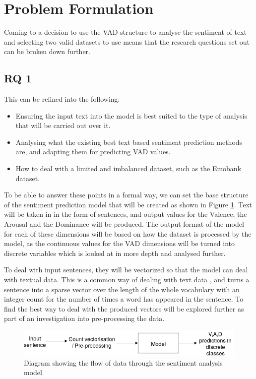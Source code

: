 \section{Problem Formulation}

Coming to a decision to use the VAD structure to analyse the sentiment of text and selecting two valid datasets to use means that the research questions set out can be broken down further.

\subsection{RQ 1}

This can be refined into the following: 

\begin{itemize}
    \item Ensuring the input text into the model is best suited to the type of analysis that will be carried out over it. 
    \item Analysing what the existing best text based sentiment prediction methods are, and adapting them for predicting VAD values. 
    \item How to deal with a limited and imbalanced dataset, such as the Emobank dataset.
\end{itemize}

To be able to answer these points in a formal way, we can set the base structure of the sentiment prediction model that will be created as shown in Figure \ref{intial:flow}. 
Text will be taken in in the form of sentences, and output values for the Valence, the Arousal and the Dominance will be produced. The output format of the model for each of these dimensions will be based on how the dataset is processed by the model, as the continuous values for the VAD dimensions will be turned into discrete variables which is looked at in more depth and analysed further.

To deal with input sentences, they will be vectorized so that the model can deal with textual data. This is a common way of dealing with text data \cite{towardsDS}, and turns a sentence into a sparse vector over the length of the whole vocabulary with an integer count for the number of times a word has appeared in the sentence. To find the best way to deal with the produced vectors will be explored further as part of an investigation into pre-processing the data. 

\begin{figure}[h]
\centering
\includegraphics[scale=0.5]{litImgs/initialFlow.png}
\caption{Diagram showing the flow of data through the sentiment analysis model}
\label{intial:flow}
\end{figure}


